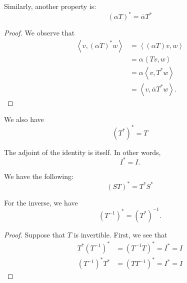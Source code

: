 \documentclass[openany]{book}
\newcommand{\innerproduct}[2]{\left\langle{#1}, {#2}\right\rangle}
\begin{document}
	\begin{thm}
		Similarly, another property is:
		\begin{equation*}
			(\alpha T)^{*} = \overline{\alpha}T^{*}
		\end{equation*}
	\end{thm}
	\begin{proof}
		We observe that
		\begin{align*}
			\innerproduct{v}{(\alpha T)^{*}w} &= \innerproduct{(\alpha T)v}{w} \\
			&= \alpha \innerproduct{Tv}{w} \\
			&= \alpha \innerproduct{v}{T^{*}w} \\
			&= \innerproduct{v}{\overline{\alpha}T^{*}w}.
		\end{align*}
	\end{proof}

	\begin{thm}
		We also have
		\begin{equation*}
			(T^{*})^{*} = T
		\end{equation*}
	\end{thm}
	\begin{thm}
		The adjoint of the identity is itself. In other words,
		\begin{equation*}
			I^{*} = I.
		\end{equation*}
	\end{thm}

	\begin{thm}
		We have the following:
		\begin{equation*}
			(ST)^{*} = T^{*}S^{*}
		\end{equation*}
	\end{thm}

	\begin{thm}
		For the inverse, we have
		\begin{equation*}
			(T^{-1})^{*} = (T^{*})^{-1}.
		\end{equation*}
	\end{thm}
	\begin{proof}
		Suppose that $T$ is invertible. First, we see that
		\begin{align*}
			T^{*}(T^{-1})^{*} &= (T^{-1} T)^{*} = I^{*} = I \\
			(T^{-1})^{*}T^{*} &= (T T^{-1})^{*} = I^{*} = I
		\end{align*}
		\begin{comment}
			
		
		Then we see the following:
		\begin{align*}
			TT^{-1} &= I \\
			(TT^{-1})^{*} &= I^{*} \\
			(T^{-1})^{*}T^{*} &= I^{*} \\
			(T^{-1})^{*}T^{*} &= I \\
			\\
			(T^{*})^{-1}T^{*} &= I
		\end{align*}
		\end{comment}
	\end{proof}
\end{document}
